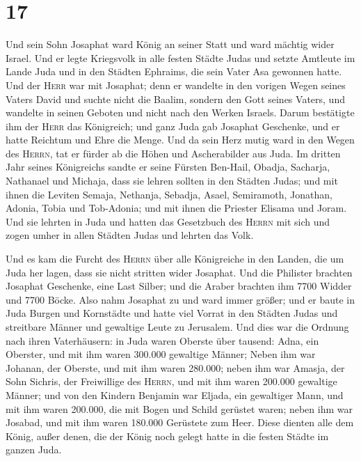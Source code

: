 \hypertarget{section-16}{%
\section{17}\label{section-16}}

 Und sein Sohn Josaphat ward König an seiner Statt und
ward mächtig wider Israel.  Und er legte Kriegsvolk in
alle festen Städte Judas und setzte Amtleute im Lande Juda und in den
Städten Ephraims, die sein Vater Asa gewonnen hatte.  Und
der \textsc{Herr} war mit Josaphat; denn er wandelte in den vorigen
Wegen seines Vaters David und suchte nicht die Baalim, 
sondern den Gott seines Vaters, und wandelte in seinen Geboten und nicht
nach den Werken Israels.  Darum bestätigte ihm der
\textsc{Herr} das Königreich; und ganz Juda gab Josaphat Geschenke, und
er hatte Reichtum und Ehre die Menge.  Und da sein Herz
mutig ward in den Wegen des \textsc{Herrn}, tat er fürder ab die Höhen
und Ascherabilder aus Juda.  Im dritten Jahr seines
Königreichs sandte er seine Fürsten Ben-Hail, Obadja, Sacharja,
Nathanael und Michaja, dass sie lehren sollten in den Städten Judas;
 und mit ihnen die Leviten Semaja, Nethanja, Sebadja,
Asael, Semiramoth, Jonathan, Adonia, Tobia und Tob-Adonia; und mit ihnen
die Priester Elisama und Joram.  Und sie lehrten in Juda
und hatten das Gesetzbuch des \textsc{Herrn} mit sich und zogen umher in
allen Städten Judas und lehrten das Volk.

 Und es kam die Furcht des \textsc{Herrn} über alle
Königreiche in den Landen, die um Juda her lagen, dass sie nicht
stritten wider Josaphat.  Und die Philister brachten
Josaphat Geschenke, eine Last Silber; und die Araber brachten ihm 7700
Widder und 7700 Böcke.  Also nahm Josaphat zu und ward
immer größer; und er baute in Juda Burgen und Kornstädte 
und hatte viel Vorrat in den Städten Judas und streitbare Männer und
gewaltige Leute zu Jerusalem.  Und dies war die Ordnung
nach ihren Vaterhäusern: in Juda waren Oberste über tausend: Adna, ein
Oberster, und mit ihm waren 300.000 gewaltige Männer; 
Neben ihm war Johanan, der Oberste, und mit ihm waren 280.000;
 neben ihm war Amasja, der Sohn Sichris, der Freiwillige
des \textsc{Herrn}, und mit ihm waren 200.000 gewaltige Männer;
 und von den Kindern Benjamin war Eljada, ein gewaltiger
Mann, und mit ihm waren 200.000, die mit Bogen und Schild gerüstet
waren;  neben ihm war Josabad, und mit ihm waren 180.000
Gerüstete zum Heer.  Diese dienten alle dem König, außer
denen, die der König noch gelegt hatte in die festen Städte im ganzen
Juda.

